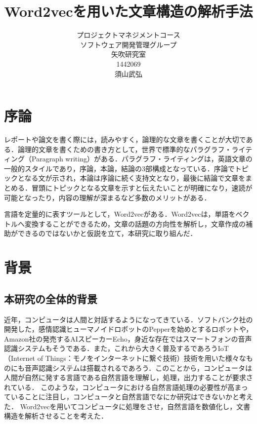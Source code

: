 \title{Word2vecを用いた文章構造の解析手法}
\author{プロジェクトマネジメントコース\\
ソフトウェア開発管理グループ\\
矢吹研究室\\
1442069\\
須山武弘}
\date{}

\maketitle


\tableofcontents%
\chapter{序論}
レポートや論文を書く際には，読みやすく，論理的な文章を書くことが大切である．論理的文章を書くための書き方として，世界で標準的なパラグラフ・ライティング（Paragraph writing）がある．パラグラフ・ライティングは，英語文章の一般的スタイルであり，序論，本論，結論の3部構成となっている．序論でトピックとなる文が示され，本論は序論に続く支持文となり，最後に結論で文章をまとめる．冒頭にトピックとなる文章を示すと伝えたいことが明確になり，速読が可能となったり，内容の理解が深まるなど多数のメリットがある．

言語を定量的に表すツールとして，Word2vecがある．Word2vecは，単語をベクトルへ変換することができるため，文章の話題の方向性を解析し，文章作成の補助ができるのではないかと仮説を立て，本研究に取り組んだ．
\newpage

\chapter{背景}
\section{本研究の全体的背景}
近年，コンピュータは人間と対話するようになってきている．ソフトバンク社の開発した，感情認識ヒューマノイドロボットのPepperを始めとするロボットや，Amazon社の発売するAIスピーカーEcho，身近な存在ではスマートフォンの音声認識システムもそうである．また，これから大きく普及するであろうIoT（Internet of Things：モノをインターネットに繋ぐ技術）技術を用いた様々なものにも音声認識システムは搭載されるであろう．このことから，コンピュータは人間が自然に発する言語である自然言語を理解し，処理，出力することが要求されている．
このような，コンピュータにおける自然言語処理の必要性が高まっていることに注目し，コンピュータと自然言語でなにか研究はできないかと考えた．
Word2vecを用いてコンピュータに処理をさせ，自然言語を数値化し，文書構造を解析させることを考えた．
\newpage


